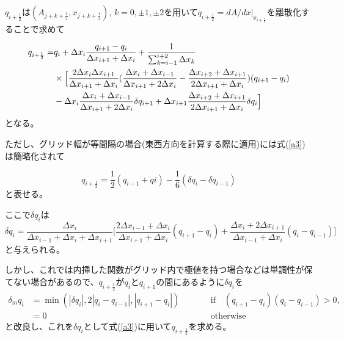 \documentclass{jsbook}
\begin{document}
$q_{i+\frac{1}{2}}$は$(A_{j+k+\frac{1}{2}},x_{j+k+\frac{1}{2}})$, $k=0,\pm 1, \pm 2$を用いて$q_{i+\frac{1}{2}}=dA/dx |_{x_{i+\frac{1}{2}}}$を離散化することで求めて

\begin{equation}
  \label{a3}
  \begin{split}
    q_{i+\frac{1}{2}}=&q_{i}+\Delta x_{i} \frac{q_{i+1}-q_{i}}{\Delta x_{i+1}+\Delta x_{i}}+\frac{1}{\sum_{k=i-1}^{i+2}\Delta x_{k}}\\
    &\times \Bigl[\frac{2\Delta x_{i}\Delta x_{i+1}}{\Delta x_{i+1}+\Delta x_{i}}(\frac{\Delta x_{i}+\Delta x_{i-1}}{\Delta x_{i+1}+2\Delta x_{i}}-\frac{\Delta x_{i+2}+\Delta x_{i+1}}{2\Delta x_{i+1}+\Delta x_{i}})(q_{i+1}-q_{i})\\
     & -\Delta x_{i}\frac{\Delta x_{i}+\Delta x_{i-1}}{\Delta x_{i+1}+2\Delta x_{i}} \delta q_{i+1}+\Delta x_{i+1} \frac{\Delta x_{i+2}+\Delta x_{i+1}}{2\Delta x_{i+1}+\Delta x_{i}} \delta q_{i}\Bigr]
  \end{split}
\end{equation}
となる。

ただし、グリッド幅が等間隔の場合(東西方向を計算する際に適用)には式(\ref{a3})は簡略化されて

\begin{equation}
  q_{i+\frac{1}{2}}=\frac{1}{2}(q_{i-1}+q{i})-\frac{1}{6}(\delta q_{i}-\delta q_{i-1})
\end{equation}
と表せる。

ここで$\delta q_{i}$は
\begin{equation}
  \delta q_{i}=\frac{\Delta x_{i}}{\Delta x_{i-1}+\Delta x_{i}+\Delta x_{i+1}}\biggl[\frac{2\Delta x_{i-1}+\Delta x_{i}}{\Delta x_{i+1}+\Delta x_{i}}(q_{i+1}-q_{i})+\frac{\Delta x_{i}+2\Delta x_{i+1}}{\Delta x_{i-1}+\Delta x_{i}}(q_{i}-q_{i-1})\biggr]
\end{equation}
と与えられる。

しかし、これでは内挿した関数がグリッド内で極値を持つ場合などは単調性が保てない場合があるので、$q_{i+\frac{1}{2}}$が$q_{i}$と$q_{i+1}$の間にあるように$\delta q_{i}$を
\begin{equation}
  \begin{aligned}
    \delta_{m} q_{i} & =\min(|\delta
    q_{i}|,2|q_{i}-q_{i-1}|,|q_{i+1}-q_{i}|) && \qquad \text{if$\quad(q_{i+1}-q_{i})(q_{i}-q_{i-1}) >0$}, \\
    & =0 && \qquad \text{otherwise}
  \end{aligned}
\end{equation}
と改良し、これを$\delta q_{i}$として式(\ref{a3})に用いて$q_{i+\frac{1}{2}}$を求める。
\end{document}
